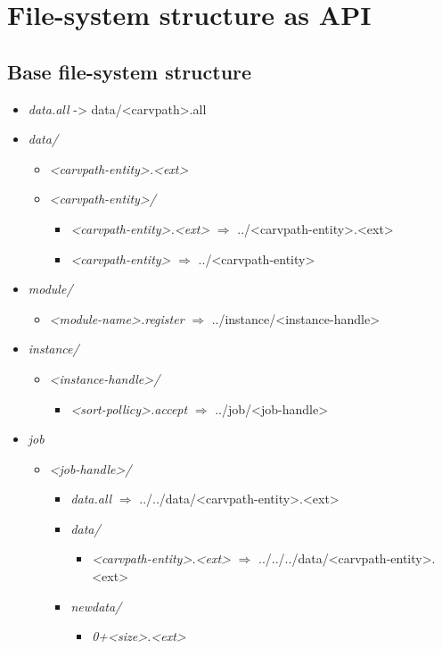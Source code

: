 \chapter{File-system structure as API}
\section{Base file-system structure} 
\begin{itemize}
  \item \emph{data.all} -> data/<carvpath>.all 
  \item \emph{data/} 
  \begin{itemize}
    \item \emph{<carvpath-entity>.<ext>} 
    \item \emph{<carvpath-entity>/} 
    \begin{itemize}
      \item \emph{<carvpath-entity>.<ext>} $\Longrightarrow$ ../<carvpath-entity>.<ext>
      \item \emph{<carvpath-entity>} $\Longrightarrow$ ../<carvpath-entity>
    \end{itemize}
  \end{itemize}
  \item \emph{module/}
  \begin{itemize}
    \item \emph{<module-name>.register} $\Longrightarrow$ ../instance/<instance-handle>
  \end{itemize}
  \item \emph{instance/}
  \begin{itemize}
    \item \emph{<instance-handle>/}
    \begin{itemize}
      \item \emph{<sort-pollicy>.accept} $\Longrightarrow$ ../job/<job-handle>
    \end{itemize}
  \end{itemize}
  \item \emph{job}
  \begin{itemize}
    \item \emph{<job-handle>/}
    \begin{itemize}
      \item \emph{data.all} $\Longrightarrow$ ../../data/<carvpath-entity>.<ext>
      \item \emph{data/}
      \begin{itemize}
        \item \emph{<carvpath-entity>.<ext>} $\Longrightarrow$ ../../../data/<carvpath-entity>.<ext>
      \end{itemize}
      \item \emph{newdata/}
      \begin{itemize}
        \item \emph{0+<size>.<ext>}
      \end{itemize}
    \end{itemize}
  \end{itemize}
\end{itemize}
